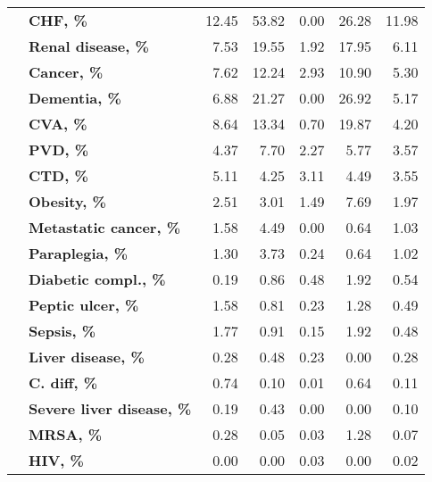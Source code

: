 \begin{tabular}{llrrrrr}
               & \textbf{CHF, \%} &    12.45 &    53.82 &     0.00 &     26.28 &      11.98 \\
               & \textbf{Renal disease, \%} &     7.53 &    19.55 &     1.92 &     17.95 &       6.11 \\
               & \textbf{Cancer, \%} &     7.62 &    12.24 &     2.93 &     10.90 &       5.30 \\
               & \textbf{Dementia, \%} &     6.88 &    21.27 &     0.00 &     26.92 &       5.17 \\
               & \textbf{CVA, \%} &     8.64 &    13.34 &     0.70 &     19.87 &       4.20 \\
               & \textbf{PVD, \%} &     4.37 &     7.70 &     2.27 &      5.77 &       3.57 \\
               & \textbf{CTD, \%} &     5.11 &     4.25 &     3.11 &      4.49 &       3.55 \\
               & \textbf{Obesity, \%} &     2.51 &     3.01 &     1.49 &      7.69 &       1.97 \\
               & \textbf{Metastatic cancer, \%} &     1.58 &     4.49 &     0.00 &      0.64 &       1.03 \\
               & \textbf{Paraplegia, \%} &     1.30 &     3.73 &     0.24 &      0.64 &       1.02 \\
               & \textbf{Diabetic compl., \%} &     0.19 &     0.86 &     0.48 &      1.92 &       0.54 \\
               & \textbf{Peptic ulcer, \%} &     1.58 &     0.81 &     0.23 &      1.28 &       0.49 \\
               & \textbf{Sepsis, \%} &     1.77 &     0.91 &     0.15 &      1.92 &       0.48 \\
               & \textbf{Liver disease, \%} &     0.28 &     0.48 &     0.23 &      0.00 &       0.28 \\
               & \textbf{C. diff, \%} &     0.74 &     0.10 &     0.01 &      0.64 &       0.11 \\
               & \textbf{Severe liver disease, \%} &     0.19 &     0.43 &     0.00 &      0.00 &       0.10 \\
               & \textbf{MRSA, \%} &     0.28 &     0.05 &     0.03 &      1.28 &       0.07 \\
               & \textbf{HIV, \%} &     0.00 &     0.00 &     0.03 &      0.00 &       0.02 \\
\bottomrule
\end{tabular}
